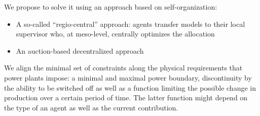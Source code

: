 \documentclass[conference]{IEEEtran}
\begin{document}
We propose to solve it using an approach based on self-organization:
\begin{itemize}
\item A so-called ``regio-central'' approach: agents transfer models to their local supervisor who, at meso-level,
centrally optimizes the allocation~\cite{Schiendorfer2014, SchiendorferSyn2014}
\item An auction-based decentralized approach~\cite{Anders-TAAS-2015}
\end{itemize}

We align the minimal set of constraints along the physical requirements that 
power plants impose: a minimal and maximal power boundary, discontinuity by 
the ability to be switched off as well as a function limiting the possible
change in production over a certain period of time. The latter function
might depend on the type of an agent as well as the current contribution.
\end{document}
